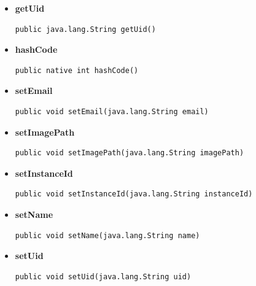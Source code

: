 \documentclass[11pt,a4paper]{report}
\begin{document}
{{{{{{\begin{itemize}
{\hypertarget{edu.kit.pse17.go_app.PersistenceLayer.UserEntity.getName()}{{\bf  getName}\\}
\begin{lstlisting}[frame=none]
public java.lang.String getName()\end{lstlisting} %
}%
\item{ 
\hypertarget{edu.kit.pse17.go_app.PersistenceLayer.UserEntity.getUid()}{{\bf  getUid}\\}
\begin{lstlisting}[frame=none]
public java.lang.String getUid()\end{lstlisting} %
}%
\item{ 
\hypertarget{edu.kit.pse17.go_app.PersistenceLayer.UserEntity.hashCode()}{{\bf  hashCode}\\}
\begin{lstlisting}[frame=none]
public native int hashCode()\end{lstlisting} %
}%
\item{ 
\hypertarget{edu.kit.pse17.go_app.PersistenceLayer.UserEntity.setEmail(java.lang.String)}{{\bf  setEmail}\\}
\begin{lstlisting}[frame=none]
public void setEmail(java.lang.String email)\end{lstlisting} %
}%
\item{ 
\hypertarget{edu.kit.pse17.go_app.PersistenceLayer.UserEntity.setImagePath(java.lang.String)}{{\bf  setImagePath}\\}
\begin{lstlisting}[frame=none]
public void setImagePath(java.lang.String imagePath)\end{lstlisting} %
}%
\item{ 
\hypertarget{edu.kit.pse17.go_app.PersistenceLayer.UserEntity.setInstanceId(java.lang.String)}{{\bf  setInstanceId}\\}
\begin{lstlisting}[frame=none]
public void setInstanceId(java.lang.String instanceId)\end{lstlisting} %
}%
\item{ 
\hypertarget{edu.kit.pse17.go_app.PersistenceLayer.UserEntity.setName(java.lang.String)}{{\bf  setName}\\}
\begin{lstlisting}[frame=none]
public void setName(java.lang.String name)\end{lstlisting} %
}%
\item{ 
\hypertarget{edu.kit.pse17.go_app.PersistenceLayer.UserEntity.setUid(java.lang.String)}{{\bf  setUid}\\}
\begin{lstlisting}[frame=none]
public void setUid(java.lang.String uid)\end{lstlisting} %
}%
\end{itemize}
}
}
}
}}}
\end{document}
